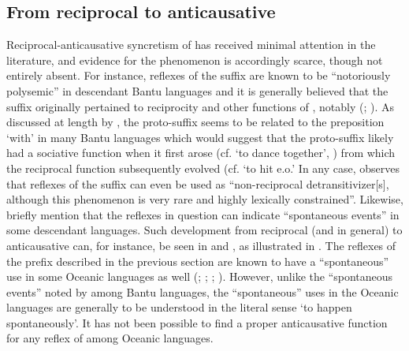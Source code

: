 \subsection{From reciprocal to anticausative} \label{diachrony:recp2antc}
Reciprocal-anticausative syncretism of  has received minimal attention in the literature, and evidence for the phenomenon is accordingly scarce, though not entirely absent. For instance, reflexes of the  suffix  are known to be “notoriously polysemic” in descendant Bantu languages \citep[732]{bostoen:al:2015} and it is generally believed that the suffix originally pertained to reciprocity and other functions of , notably  (\citealt[76]{schadeberg:2003}; \citealt[137ff.]{dom:al:2016}). As discussed at length by \cite{maslova:2000}, the proto-suffix seems to be related to the preposition  ‘with’ in many Bantu languages which would suggest that the proto-suffix  likely had a sociative function when it first arose (cf.   ‘to dance together’, \citealt[273, 277]{ndayiragije:2006}) from which the reciprocal function subsequently evolved (cf.   ‘to hit e.o.’ In any case, \cite[345]{maslova:2007} observes that reflexes of the suffix  can even be used as “non-reciprocal detransitivizer[s], although this phenomenon is very rare and highly lexically constrained”. Likewise, \cite[139]{dom:al:2016} briefly mention that the reflexes in question can indicate “spontaneous events” in some descendant languages. Such development from reciprocal (and  in general) to anticausative can, for instance, be seen in  \citep[209f.]{schaub:1985} and  \citep[191]{ambouroue:2007}, as illustrated in . The reflexes of the  prefix  described in the previous section are known to have a “spontaneous” use in some Oceanic languages as well (\citealt[48]{lichtenberk:2000}; \citealt[32, 51]{bril:2005}; \citealt[109]{moyse-faurie:2008}; \citeyear[109]{moyse-faurie:2017}). However, unlike the “spontaneous events” noted by \cite{dom:al:2016} among Bantu languages, the “spontaneous” uses in the Oceanic languages are generally to be understood in the literal sense ‘to happen spontaneously’. It has not been possible to find a proper anticausative function for any reflex of  among Oceanic languages.

